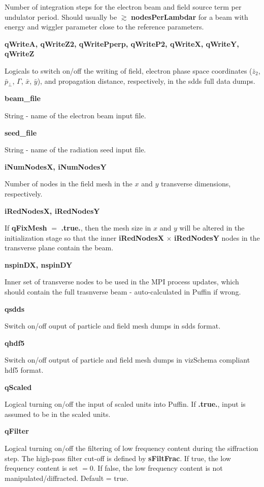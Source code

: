 \documentclass[12pt]{article}%
\begin{document}
Number of integration steps for the electron beam and field source term per undulator period. Should usually be $\gtrsim$ {\bf nodesPerLambdar} for a beam with energy and wiggler parameter close to the reference parameters.

{\bf qWriteA, qWriteZ2, qWritePperp, qWriteP2, qWriteX, qWriteY, qWriteZ}

Logicals to switch on/off the writing of field, electron phase space coordinates ($\bar{z}_2$, $\bar{p}_\bot$, $\Gamma$, $\bar{x}$, $\bar{y}$), and propagation distance, respectively, in the sdds full data dumps.

{\bf beam\_file}

String - name of the electron beam input file.

{\bf seed\_file}

String - name of the radiation seed input file.

{\bf iNumNodesX, iNumNodesY}

Number of nodes in the field mesh in the $x$ and $y$ transverse dimensions, respectively.

{\bf iRedNodesX, iRedNodesY}

If {\bf qFixMesh} $=$ {\bf .true.}, then the mesh size in $x$ and $y$ will be altered in the initialization stage so that the inner {\bf iRedNodesX} $\times$ {\bf iRedNodesY} nodes in the transverse plane contain the beam.



{\bf nspinDX, nspinDY}

Inner set of transverse nodes to be used in the MPI process updates, which should contain the full trasnverse beam - auto-calculated in Puffin if wrong.

{\bf qsdds}

Switch on/off ouput of particle and field mesh dumps in sdds format.

{\bf qhdf5}

Switch on/off output of particle and field mesh dumps in vizSchema compliant hdf5 format.

{\bf qScaled}

Logical turning on/off the input of scaled units into Puffin. If {\bf .true.}, input is assumed to be in the scaled units. 

{\bf qFilter}

Logical turning on/off the filtering of low frequency content during the siffraction step. The high-pass filter cut-off is defined by {\bf sFiltFrac}. If true, the low frequency content is set $=0$. If false, the low frequency content is not manipulated/diffracted. Default = true.
\end{document}
